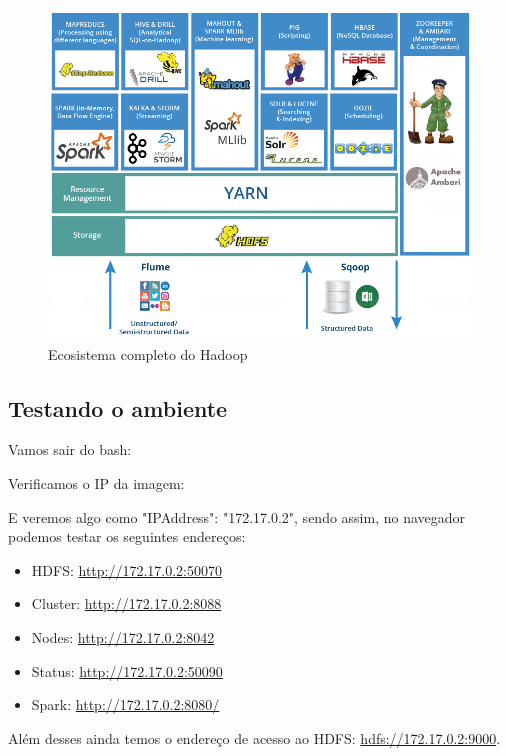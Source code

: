 \documentclass[a4paper,11pt]{article}
\begin{document}
\begin{figure}[H]
	\centering
	\includegraphics[width=1.0\textwidth]{imgHadoop/ecosistema.png}
	\caption{Ecosistema completo do Hadoop}
\end{figure}



\subsection{Testando o ambiente}
Vamos sair do bash: \\

Verificamos o IP da imagem: \\

E veremos algo como "IPAddress": "172.17.0.2", sendo assim, no navegador podemos testar os seguintes endereços: \vspace{-1em}
\begin{itemize}
	\item HDFS: \url{http://172.17.0.2:50070}
	\item Cluster: \url{http://172.17.0.2:8088}
	\item Nodes: \url{http://172.17.0.2:8042}
	\item Status: \url{http://172.17.0.2:50090}
	\item Spark: \url{http://172.17.0.2:8080/}
\end{itemize}
Além desses ainda temos o endereço de acesso ao HDFS: \url{hdfs://172.17.0.2:9000}.
\end{document}

